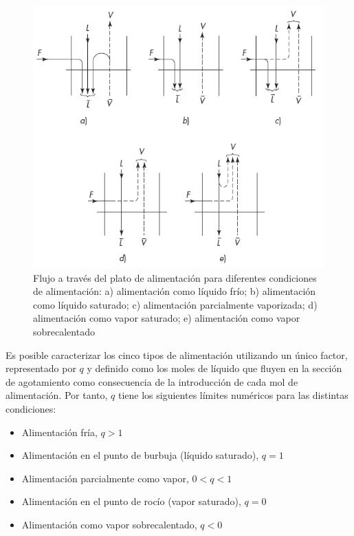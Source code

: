 \documentclass[11pt]{book}
\begin{document}
\begin{figure}[H]
    \centering
    \includegraphics{img/destilacion/PlatoAlimentacion.png}
    \caption{Flujo a través del plato de alimentación para diferentes condiciones de alimentación: a) alimentación como líquido frío; b) alimentación como líquido saturado; c) alimentación parcialmente vaporizada; d) alimentación como vapor saturado; e) alimentación como vapor sobrecalentado}
    \label{fig:PlatoAlimentacionDestilacion}
\end{figure}


Es posible caracterizar los cinco tipos de alimentación utilizando un único factor, representado por $q$ y definido como los moles de líquido que fluyen en la sección de agotamiento como consecuencia de la introducción de cada mol de alimentación. Por tanto, $q$ tiene los siguientes límites numéricos para las distintas condiciones:

\begin{itemize}
    \item Alimentación fría, $q > 1$
    \item Alimentación en el punto de burbuja (líquido saturado), $q = 1$
    \item Alimentación parcialmente como vapor, $0 < q < 1$
    \item Alimentación en el punto de rocío (vapor saturado), $q = 0$
    \item Alimentación como vapor sobrecalentado, $q < 0$
\end{itemize}
\end{document}
